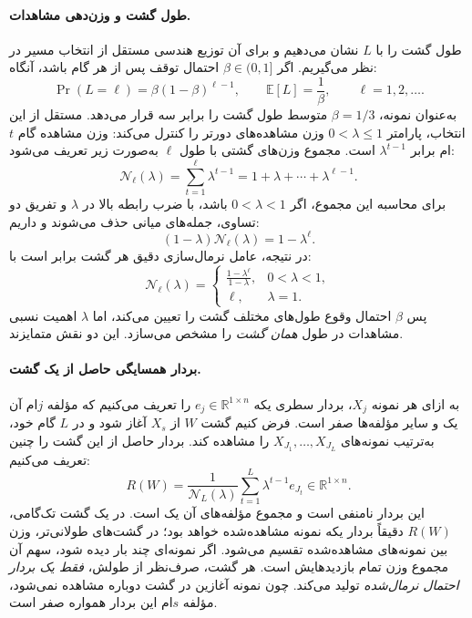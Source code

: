 \paragraph{طول گشت و وزن‌دهی مشاهدات.}
طول گشت را با $L$ نشان می‌دهیم و برای آن توزیع هندسی مستقل از انتخاب مسیر در نظر می‌گیریم. اگر $\beta\in(0,1]$ احتمال توقف پس از هر گام باشد، آنگاه:
\begin{equation}\label{eq:ch3-geometric-length}
\Pr(L=\ell)=\beta(1-\beta)^{\ell-1},\qquad
\mathbb E[L]=\frac{1}{\beta},\qquad \ell=1,2,\ldots.
\end{equation}
به‌عنوان نمونه، $\beta=1/3$ متوسط طول گشت را برابر سه قرار می‌دهد. مستقل از این انتخاب، پارامتر $0<\lambda\le1$ وزن مشاهده‌های دورتر را کنترل می‌کند: وزن مشاهده گام $t$ام برابر $\lambda^{t-1}$ است. مجموع وزن‌های گشتی با طول $\ell$ به‌صورت زیر تعریف می‌شود:
\begin{equation}\label{eq:ch3-walk-weight-normalizer}
\mathcal N_\ell(\lambda)=\sum_{t=1}^{\ell}\lambda^{t-1}
=1+\lambda+\cdots+\lambda^{\ell-1}.
\end{equation}
برای محاسبه این مجموع، اگر $0<\lambda<1$ باشد، با ضرب رابطه بالا در $\lambda$ و تفریق دو تساوی، جمله‌های میانی حذف می‌شوند و داریم:
\begin{equation}\label{eq:ch3-walk-weight-normalizer-telescoping}
(1-\lambda)\mathcal N_\ell(\lambda)=1-\lambda^\ell.
\end{equation}
در نتیجه، عامل نرمال‌سازی دقیق هر گشت برابر است با:
\begin{equation}\label{eq:ch3-walk-weight-normalizer-closed}
\mathcal N_\ell(\lambda)=
\begin{cases}
\displaystyle\frac{1-\lambda^\ell}{1-\lambda},&0<\lambda<1,\\[5pt]
\ell,&\lambda=1.
\end{cases}
\end{equation}
پس $\beta$ احتمال وقوع طول‌های مختلف گشت را تعیین می‌کند، اما $\lambda$ اهمیت نسبی مشاهدات در طول \emph{همان گشت} را مشخص می‌سازد. این دو نقش متمایزند.

\paragraph{بردار همسایگی حاصل از یک گشت.}
به ازای هر نمونه $X_j$، بردار سطری یکه $e_j\in\mathbb R^{1\times n}$ را تعریف می‌کنیم که مؤلفه $j$ام آن یک و سایر مؤلفه‌ها صفر است. فرض کنیم گشت $W$ از $X_s$ آغاز شود و در $L$ گام خود، به‌ترتیب نمونه‌های $X_{J_1},\ldots,X_{J_L}$ را مشاهده کند. بردار حاصل از این گشت را چنین تعریف می‌کنیم:
\begin{equation}\label{eq:ch3-walk-vector}
R(W)=\frac{1}{\mathcal N_L(\lambda)}
\sum_{t=1}^{L}\lambda^{t-1}e_{J_t}\in\mathbb R^{1\times n}.
\end{equation}
این بردار نامنفی است و مجموع مؤلفه‌های آن یک است. در یک گشت تک‌گامی، $R(W)$ دقیقاً بردار یکه نمونه مشاهده‌شده خواهد بود؛ در گشت‌های طولانی‌تر، وزن بین نمونه‌های مشاهده‌شده تقسیم می‌شود. اگر نمونه‌ای چند بار دیده شود، سهم آن مجموع وزن تمام بازدیدهایش است. هر گشت، صرف‌نظر از طولش، \emph{فقط یک بردار احتمال نرمال‌شده} تولید می‌کند. چون نمونه آغازین در گشت دوباره مشاهده نمی‌شود، مؤلفه $s$ام این بردار همواره صفر است.

